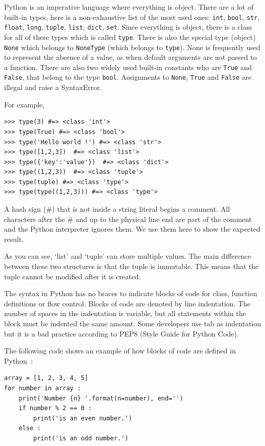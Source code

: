 \documentclass[a4paper,10pt]{article}
\begin{document}
Python is an imperative language where everything is object.
There are a lot of built-in types, here is a non-exhaustive list of the most used ones: \lstinline{int}, \lstinline{bool}, \lstinline{str}, \lstinline{float}, \lstinline{long}, \lstinline{tuple}, \lstinline{list}, \lstinline{dict}, \lstinline{set}.
Since everything is object, there is a class for all of these types which is called \lstinline{type}.
There is also the special type (object) \lstinline{None} which belongs to \lstinline{NoneType} (which belongs to \lstinline{type}).
None is frequently used to represent the absence of a value, as when default arguments are not passed to a function.
There are also two widely used built-in constants who are \lstinline{True} and \lstinline{False}, that belong to the type \lstinline{bool}. Assignments to \lstinline{None}, \lstinline{True} and \lstinline{False} are illegal and raise a SyntaxError.

For example,
\begin{lstlisting}
>>> type(3) #=> <class 'int'>
>>> type(True) #=> <class 'bool'>
>>> type('Hello world !') #=> <class 'str'>
>>> type([1,2,3])  #=> <class 'list'>
>>> type({'key':'value'})  #=> <class 'dict'>
>>> type((1,2,3))  #=> <class 'tuple'>
>>> type(tuple) #=> <class 'type'>
>>> type(type((1,2,3))) #=> <class 'type'>
\end{lstlisting}

A hash sign (\#) that is not inside a string literal begins a comment. All characters after the \# and up to the physical line end are part of the comment and the Python interpreter ignores them. We use them here to show the expected result.

As you can see, ‘list’ and ‘tuple’ can store multiple values. The main difference between these two structures is that the tuple is immutable. This means that the tuple cannot be modified after it is created.

The syntax in Python has no braces to indicate blocks of code for class, function definitions or flow control. Blocks of code are denoted by line indentation. The number of spaces in the indentation is variable, but all statements within the block must be indented the same amount. Some developers use tab as indentation but it is a bad practice according to PEP8 (Style Guide for Python Code).

The following code shows an example of how blocks of code are defined in \mbox{Python :}

\begin{lstlisting}
array = [1, 2, 3, 4, 5]
for number in array :
    print('Number {n} '.format(n=number), end='')
    if number % 2 == 0 :
        print('is an even number.')
    else :
        print('is an odd number.')
\end{lstlisting}
\end{document}
